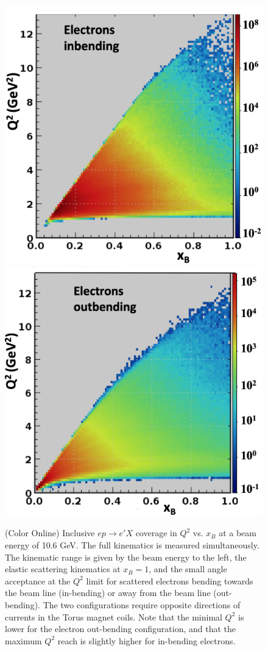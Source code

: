 \documentclass[final,3p,twocolumn]{elsarticle}
\begin{document}
\begin{figure}[t!]
\includegraphics[width=0.97\columnwidth]{epX-in.png}
\includegraphics[width=1.0\columnwidth]{epX-out.png}
\caption{(Color Online) Inclusive $ep \to e'X$ coverage in $Q^2$ vs. $x_B$ at a beam energy of 10.6 GeV. 
The full kinematics is measured simultaneously. The
kinematic range is given by the beam energy to the left, the elastic scattering kinematics at $x_B = 1$, and the
small angle acceptance at the $Q^2$ limit for scattered electrons bending towards the beam line (in-bending) or away from the 
beam line (out-bending). The two configurations require opposite directions of currents in the Torus magnet coils.
Note that the minimal $Q^2$ is lower for the electron out-bending configuration, and that the maximum $Q^2$ 
reach is slightly higher for in-bending electrons.} 
\label{electron-acceptance}
\end{figure}
\end{document}
